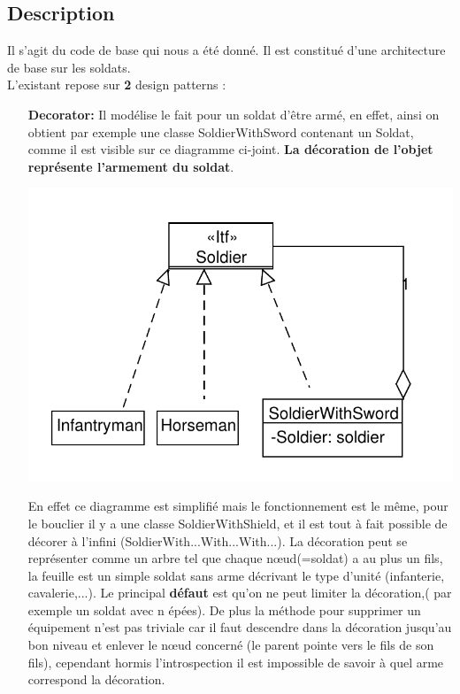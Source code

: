 \documentclass[12pt]{article}
\begin{document}
\subsection{Description}
Il s'agit du code de base qui nous a été donné. Il est constitué d'une architecture de base sur les soldats.\\
L'existant repose sur \textbf{2} design patterns :
\begin{enumerate}
\item[\textbf{Decorator:}] Il modélise le fait pour un soldat d'être armé,
en effet, ainsi on obtient par exemple une classe SoldierWithSword contenant un Soldat, comme il est visible sur ce diagramme ci-joint.
\textbf{La décoration de l'objet représente l'armement du soldat}.

\includegraphics[scale=1]{../UML/Realdecorator}

En effet ce diagramme est simplifié mais le fonctionnement est le même,
pour le bouclier il y a une classe SoldierWithShield, et il est tout à fait 
possible de décorer à l'infini (SoldierWith...With...With...).
La décoration peut se représenter comme un arbre tel que chaque nœud(=soldat) a au plus un fils, la feuille est un simple soldat sans arme décrivant le type d'unité
(infanterie, cavalerie,...).
Le principal \textbf{défaut} est qu'on ne peut limiter la décoration,( par exemple un soldat avec n épées). De plus la méthode pour supprimer un équipement n'est pas triviale car il faut descendre dans la décoration jusqu'au bon niveau et enlever
le nœud concerné (le parent pointe vers le fils de son fils), cependant
hormis l'introspection il est impossible de savoir à quel arme correspond la décoration.


\end{enumerate}
\end{document}
